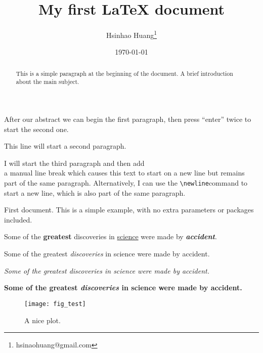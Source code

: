 \documentclass[12pt, a4paper]{article} %
\title{My first LaTeX document}                            %
\author{Hsinhao Huang\thanks{hsinaohuang@gmail.com}}       %
\date{\today}                                              %
\begin{document}

    \maketitle

    \tableofcontents

    \begin{abstract}
        This is a simple paragraph at the beginning of the
        document. A brief introduction about the main subject.
    \end{abstract}


    After our abstract we can begin the first paragraph, then press ``enter'' twice to start the second one.

    This line will start a second paragraph.

    I will start the third paragraph and then add \\ a manual line break which causes
    this text to start on a new line but remains part of the same paragraph.
    Alternatively, I can use the \verb|\newline|\newline command to start a new line,
    which is also part of the same paragraph.

    First document. This is a simple example, with no
    extra parameters or packages included.

    Some of the \textbf{greatest}                          %
    discoveries in \underline{science}                     %
    were made by \textbf{\textit{accident}}.               %

    Some of the greatest \emph{discoveries} in science
    were made by accident.

    \textit{Some of the greatest \emph{discoveries}        %
    in science were made by accident.}

    \textbf{Some of the greatest \emph{discoveries}
    in science were made by accident.}

    \begin{figure}[h]
        \centering
        \texttt{[image: fig\_test]}   %
        \caption
        {
            A nice plot.
        }
        \label{fig:test}
    \end{figure}
\end{document}
